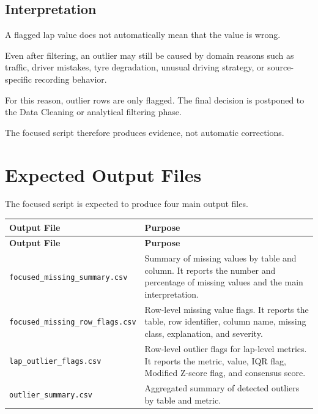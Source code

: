 \documentclass[a4paper,11pt]{article}
\begin{document}
	\subsection{Interpretation}
	
	A flagged lap value does not automatically mean that the value is wrong.
	
	Even after filtering, an outlier may still be caused by domain reasons such as traffic,
	driver mistakes, tyre degradation, unusual driving strategy, or source-specific
	recording behavior.
	
	For this reason, outlier rows are only flagged.
	The final decision is postponed to the Data Cleaning or analytical filtering phase.
	
	The focused script therefore produces evidence, not automatic corrections.

	\section{Expected Output Files}
	
	The focused script is expected to produce four main output files.
	
	\begin{longtable}{p{6cm}p{9cm}}
		\toprule
		\textbf{Output File} & \textbf{Purpose} \\
		\midrule
		\endfirsthead
		
		\toprule
		\textbf{Output File} & \textbf{Purpose} \\
		\midrule
		\endhead
		
		\texttt{focused\_missing\_summary.csv}
		& Summary of missing values by table and column. It reports the number and percentage of missing values and the main interpretation. \\
		\midrule
		
		\texttt{focused\_missing\_row\_flags.csv}
		& Row-level missing value flags. It reports the table, row identifier, column name, missing class, explanation, and severity. \\
		\midrule
		
		\texttt{lap\_outlier\_flags.csv}
		& Row-level outlier flags for lap-level metrics. It reports the metric, value, IQR flag, Modified Z-score flag, and consensus score. \\
		\midrule
		
		\texttt{outlier\_summary.csv}
		& Aggregated summary of detected outliers by table and metric. \\
		\bottomrule
	\end{longtable}
	

	
\end{document}
